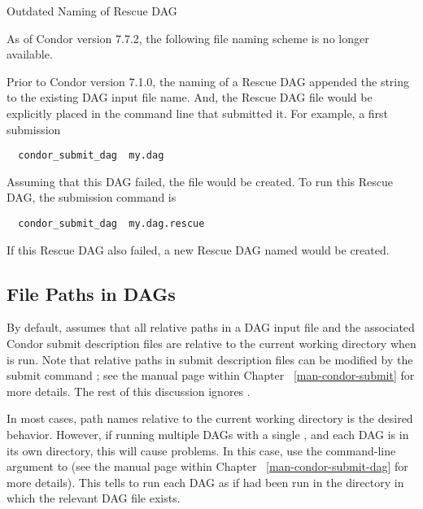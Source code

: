 \begin{description}
\item[Outdated Naming of Rescue DAG]
\end{description}
As of Condor version 7.7.2, the following file naming scheme is 
no longer available.

Prior to Condor version 7.1.0, the naming of a Rescue DAG
appended the string  to the existing DAG input
file name. 
And, the Rescue DAG file would be explicitly placed in 
the command line that submitted it.
For example,  a first submission
\begin{verbatim}
  condor_submit_dag  my.dag
\end{verbatim}
Assuming that this DAG failed, the file 
would be created.
To run this Rescue DAG, the submission command is
\begin{verbatim}
  condor_submit_dag  my.dag.rescue
\end{verbatim}
If this Rescue DAG also failed, a new Rescue DAG named
 would be created.

\subsection{\label{sec:DAGPaths}File Paths in DAGs}

By default,  assumes that all relative paths in a
DAG input file and the associated Condor submit description files
are relative to the current
working directory when  is run.  
Note that 
relative paths in submit description files can be modified by the submit command
; see the  manual page within Chapter
~\ref{man-condor-submit} for more details.  The rest of this discussion
ignores .

In most cases, path names relative to the current working directory 
is the desired behavior.
However, if running
multiple DAGs with a single , and each DAG is in its
own directory, this will cause problems.  In this case,
use the  command-line argument to
 (see the  manual page within Chapter
~\ref{man-condor-submit-dag} for more details).
This tells  to run each DAG
as if  had been run in the directory in which
the relevant DAG file exists.

